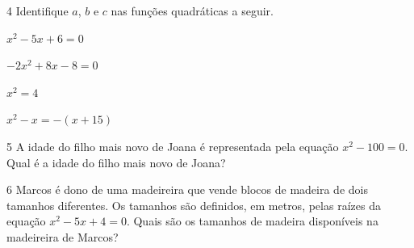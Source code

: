 


\pagebreak

\num{4} Identifique $a$, $b$ e $c$ nas funções quadráticas a seguir.

\begin{escolha}[itemsep=0pt]
\item $x^2 - 5x + 6 = 0$
\item $-2x^2 + 8x - 8 = 0$
\item $x^2 = 4$
\item $x^2 - x = -(x + 15)$
\end{escolha}









\bigskip

\num{5} A idade do filho mais novo de Joana é representada pela equação $x^2 -
100 = 0$. Qual é a idade do filho mais novo de Joana?

\bigskip










\bigskip

\num{6} Marcos é dono de uma madeireira que vende blocos de madeira de dois
tamanhos diferentes. Os tamanhos são definidos, em metros, pelas raízes
da equação $x^2 - 5x + 4 = 0$. Quais são os tamanhos de madeira disponíveis
na madeireira de Marcos?

